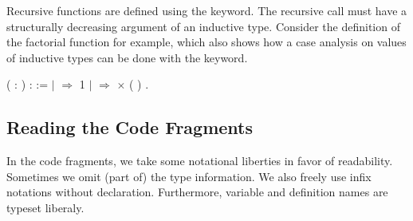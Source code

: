 Recursive functions are defined using the 
keyword. The recursive call must have a structurally decreasing
argument of an inductive type. Consider the definition of the
factorial function for example, which also shows how a case analysis
on values of inductive types can be done with the 
keyword.
\begin{singlespace}
\begin{coqdoccode}
\coqdocnoindent
{}
( :
)
:
:=\coqdoceol
\coqdocindent{1.00em}
  \coqdoceol
\coqdocindent{1.00em}
\ensuremath{|}
\ensuremath{\Rightarrow} 1\coqdoceol
\coqdocindent{1.00em}
\ensuremath{|}
 \ensuremath{\Rightarrow}
 \ensuremath{\times}
(
)\coqdoceol
\coqdocindent{1.00em}
.\coqdoceol
\end{coqdoccode}
\end{singlespace}


\subsection{Reading the Code Fragments}

In the \Coq code fragments, we take some notational liberties in favor
of readability. Sometimes we omit (part of) the type information. We
also freely use infix notations without declaration. Furthermore,
variable and definition names are typeset liberaly.

